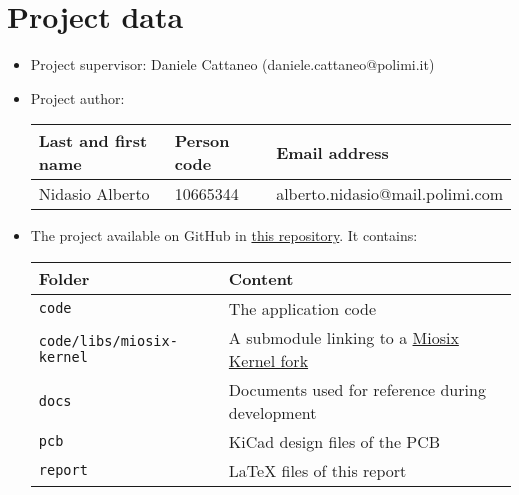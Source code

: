 \section{Project data}

\begin{itemize}
    \item Project supervisor: Daniele Cattaneo (daniele.cattaneo@polimi.it)
    \item Project author:
          \begin{center}
              \begin{tabular}{lll}
                  Last and first name & Person code & Email address                   \\
                  \hline
                  Nidasio Alberto     & 10665344    & alberto.nidasio@mail.polimi.com \\
              \end{tabular}
          \end{center}
    \item The project available on GitHub in \href{https://github.com/NidasioAlberto/signal-generator}{this repository}. It contains:
          \begin{center}
              \begin{tabular}{ll}
                  Folder                           & Content                                                                                             \\
                  \hline
                  \texttt{code}                    & The application code                                                                                \\
                  \texttt{code/libs/miosix-kernel} & A submodule linking to a \href{https://github.com/NidasioAlberto/miosix-kernel}{Miosix Kernel fork} \\
                  \texttt{docs}                    & Documents used for reference during development                                                     \\
                  \texttt{pcb}                     & KiCad design files of the PCB                                                                       \\
                  \texttt{report}                  & LaTeX files of this report
              \end{tabular}
          \end{center}
\end{itemize}
